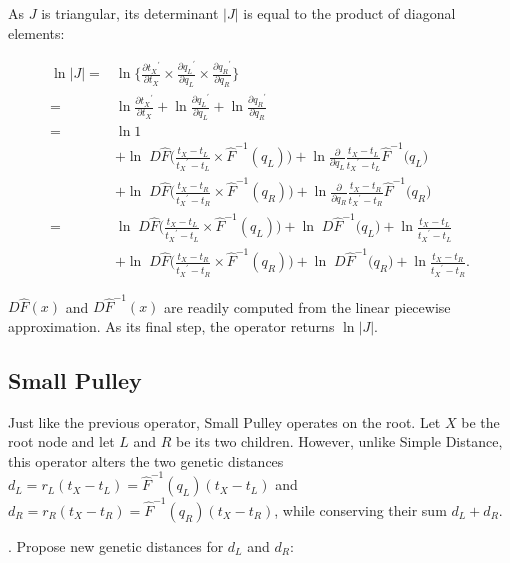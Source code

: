 \documentclass[12pt]{article}
\begin{document}
As $J$ is triangular, its determinant $|J|$ is equal to the product of diagonal elements:


\begin{align}
	\ln |J| =&  \ln \{ \frac{\partial {t_X}^\prime}{\partial t_X} \times \frac{\partial {q_L}^\prime}{\partial q_L} \times \frac{\partial {q_R}^\prime}{\partial q_R} \} \nonumber \\
			=& \ln \frac{\partial {t_X}^\prime}{\partial t_X} +  \ln \frac{\partial {q_L}^\prime}{\partial q_L} + \ln \frac{\partial {q_R}^\prime}{\partial q_R} \nonumber \\
			=& \ln 1  \nonumber\\
			&+ \ln \; D \hat{F}\Big( \frac{t_X - t_L}{{t_X}^\prime - t_L} \times \hat{F}^{-1}(q_L) \Big) + \ln \frac{\partial}{\partial q_L} \frac{t_X - t_L}{{t_X}^\prime - t_L} \hat{F}^{-1} \Big( q_L \Big) \nonumber\\
			&+ \ln \; D \hat{F}\Big( \frac{t_X - t_R}{{t_X}^\prime - t_R}\times \hat{F}^{-1}(q_R) \Big) + \ln \frac{\partial}{\partial q_R} \frac{t_X - t_R}{{t_X}^\prime - t_R} \hat{F}^{-1} \Big( q_R \Big) \nonumber\\
			=& \ln \; D \hat{F}\Big( \frac{t_X - t_L}{{t_X}^\prime - t_L} \times \hat{F}^{-1}(q_L) \Big) + \ln \; D \hat{F}^{-1} \Big( q_L \Big) + \ln \frac{t_X - t_L}{{t_X}^\prime - t_L}\nonumber \\
			&+ \ln \; D \hat{F}\Big( \frac{t_X - t_R}{{t_X}^\prime - t_R}\times \hat{F}^{-1}(q_R) \Big) + \ln \; D \hat{F}^{-1} \Big( q_R \Big) + \ln  \frac{t_X - t_R}{{t_X}^\prime - t_R}.
\end{align}


$D \hat{F}(x)$ and $D \hat{F}^{-1}(x)$ are readily computed from the linear piecewise approximation. As its final step, the operator returns $\ln |J|$. 


\subsection{Small Pulley}

Just like the previous operator, Small Pulley operates on the root. Let $X$ be the root node and let $L$ and $R$ be its two children. However, unlike Simple Distance, this operator alters the two genetic distances $d_L = r_L (t_X - t_L) = \hat{F}^{-1} (q_L) (t_X - t_L)$ and $d_R = r_R (t_X - t_R) = \hat{F}^{-1} (q_R) (t_X - t_R)$, while conserving their sum $d_L + d_R$.



. Propose new genetic distances for $d_L$ and $d_R$:
\end{document}
